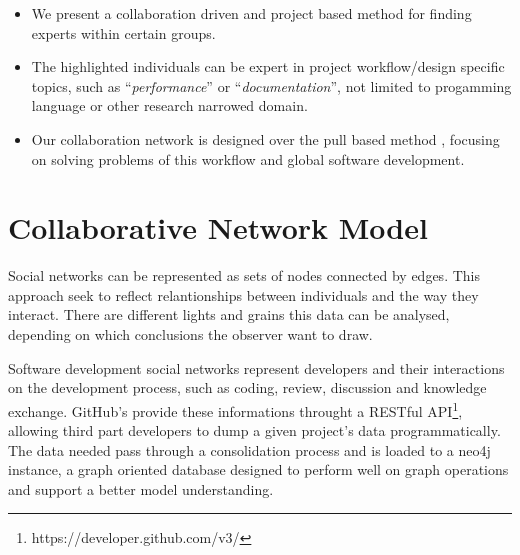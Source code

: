 \documentclass[conference]{IEEEtran}
\begin{document}
\begin{itemize}
  \item We present a collaboration driven and project based method for finding experts within certain groups.
  \item The highlighted individuals can be expert in project workflow/design specific topics, such as ``\textit{performance}'' or ``\textit{documentation}'', not limited to progamming language or other research narrowed domain.
  \item Our collaboration network is designed over the pull based method \cite{gousios2014}, focusing on solving problems of this workflow and global software development.
\end{itemize}

\section{Collaborative Network Model}

Social networks can be represented as sets of nodes connected by edges. This approach seek to reflect relantionships between individuals and the way they interact. There are different lights and grains this data can be analysed, depending on which conclusions the observer want to draw.

Software development social networks represent developers and their interactions on the development process, such as coding, review, discussion and knowledge exchange. GitHub's provide these informations throught a RESTful API\footnote{https://developer.github.com/v3/}, allowing third part developers to dump a given project's data programmatically. The data needed pass through a consolidation process and is loaded to a neo4j instance, a graph oriented database designed to perform well on graph operations and support a better model understanding.
\end{document}
